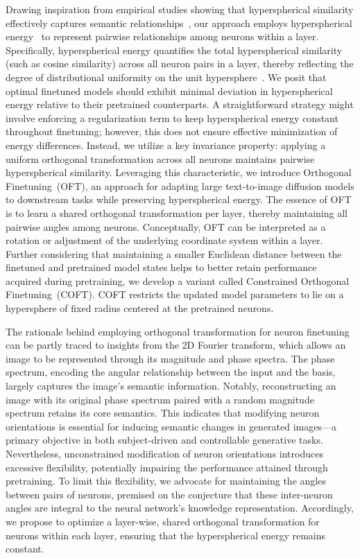 Drawing inspiration from empirical studies showing that hyperspherical similarity effectively captures semantic relationships~\cite{liu2017deep,liu2018decoupled,chen2020angular}, our approach employs hyperspherical energy~\cite{liu2018learning} to represent pairwise relationships among neurons within a layer. Specifically, hyperspherical energy quantifies the total hyperspherical similarity (such as cosine similarity) across all neuron pairs in a layer, thereby reflecting the degree of distributional uniformity on the unit hypersphere~\cite{liu2021learning}. We posit that optimal finetuned models should exhibit minimal deviation in hyperspherical energy relative to their pretrained counterparts. A straightforward strategy might involve enforcing a regularization term to keep hyperspherical energy constant throughout finetuning; however, this does not ensure effective minimization of energy differences. Instead, we utilize a key invariance property: applying a uniform orthogonal transformation across all neurons maintains pairwise hyperspherical similarity. Leveraging this characteristic, we introduce Orthogonal Finetuning~(OFT), an approach for adapting large text-to-image diffusion models to downstream tasks while preserving hyperspherical energy. The essence of OFT is to learn a shared orthogonal transformation per layer, thereby maintaining all pairwise angles among neurons. Conceptually, OFT can be interpreted as a rotation or adjustment of the underlying coordinate system within a layer. Further considering that maintaining a smaller Euclidean distance between the finetuned and pretrained model states helps to better retain performance acquired during pretraining, we develop a variant called Constrained Orthogonal Finetuning~(COFT). COFT restricts the updated model parameters to lie on a hypersphere of fixed radius centered at the pretrained neurons.

The rationale behind employing orthogonal transformation for neuron finetuning can be partly traced to insights from the 2D Fourier transform, which allows an image to be represented through its magnitude and phase spectra. The phase spectrum, encoding the angular relationship between the input and the basis, largely captures the image's semantic information. Notably, reconstructing an image with its original phase spectrum paired with a random magnitude spectrum retains its core semantics. This indicates that modifying neuron orientations is essential for inducing semantic changes in generated images—a primary objective in both subject-driven and controllable generative tasks. Nevertheless, unconstrained modification of neuron orientations introduces excessive flexibility, potentially impairing the performance attained through pretraining. To limit this flexibility, we advocate for maintaining the angles between pairs of neurons, premised on the conjecture that these inter-neuron angles are integral to the neural network’s knowledge representation. Accordingly, we propose to optimize a layer-wise, shared orthogonal transformation for neurons within each layer, ensuring that the hyperspherical energy remains constant.

